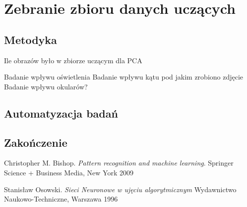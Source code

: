\documentclass{article}
\begin{document}
 
\section{Zebranie zbioru danych uczących}
\subsection{Metodyka}

Ile obrazów było w zbiorze uczącym dla PCA

Badanie wpływu oświetlenia
Badanie wpływu kątu pod jakim zrobiono zdjęcie
Badanie wpływu okularów?



\subsection{Automatyzacja badań}


\subsection{Zakończenie}

\newpage
\begin{thebibliography}{9}

Christopher M. Bishop.
\textit{Pattern recognition and machine learning}.
Springer Science + Business Media, New York 2009

Stanisław Osowski.
\textit{Sieci Neuronowe w ujęciu algorytmicznym}
Wydawnictwo Naukowo-Techniczne, Warszawa 1996

\end{thebibliography}
\end{document}
